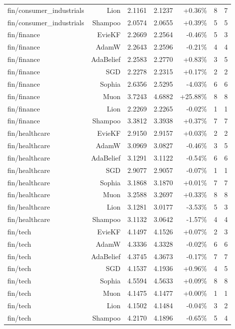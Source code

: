 \begin{table}[t]
\begin{tabular}{lrrrrrr}
fin/consumer\_industrials & Lion & 2.1161 & 2.1237 & +0.36\% & 8 & 7 \\
fin/consumer\_industrials & Shampoo & 2.0574 & 2.0655 & +0.39\% & 5 & 5 \\
fin/finance & EvieKF & 2.2669 & 2.2564 & -0.46\% & 5 & 3 \\
fin/finance & AdamW & 2.2643 & 2.2596 & -0.21\% & 4 & 4 \\
fin/finance & AdaBelief & 2.2583 & 2.2770 & +0.83\% & 3 & 5 \\
fin/finance & SGD & 2.2278 & 2.2315 & +0.17\% & 2 & 2 \\
fin/finance & Sophia & 2.6356 & 2.5295 & -4.03\% & 6 & 6 \\
fin/finance & Muon & 3.7243 & 4.6882 & +25.88\% & 8 & 8 \\
fin/finance & Lion & 2.2269 & 2.2265 & -0.02\% & 1 & 1 \\
fin/finance & Shampoo & 3.3812 & 3.3938 & +0.37\% & 7 & 7 \\
fin/healthcare & EvieKF & 2.9150 & 2.9157 & +0.03\% & 2 & 2 \\
fin/healthcare & AdamW & 3.0969 & 3.0827 & -0.46\% & 3 & 5 \\
fin/healthcare & AdaBelief & 3.1291 & 3.1122 & -0.54\% & 6 & 6 \\
fin/healthcare & SGD & 2.9077 & 2.9057 & -0.07\% & 1 & 1 \\
fin/healthcare & Sophia & 3.1868 & 3.1870 & +0.01\% & 7 & 7 \\
fin/healthcare & Muon & 3.2588 & 3.2697 & +0.33\% & 8 & 8 \\
fin/healthcare & Lion & 3.1281 & 3.0177 & -3.53\% & 5 & 3 \\
fin/healthcare & Shampoo & 3.1132 & 3.0642 & -1.57\% & 4 & 4 \\
fin/tech & EvieKF & 4.1497 & 4.1526 & +0.07\% & 2 & 3 \\
fin/tech & AdamW & 4.3336 & 4.3328 & -0.02\% & 6 & 6 \\
fin/tech & AdaBelief & 4.3745 & 4.3673 & -0.17\% & 7 & 7 \\
fin/tech & SGD & 4.1537 & 4.1936 & +0.96\% & 4 & 5 \\
fin/tech & Sophia & 4.5594 & 4.5633 & +0.09\% & 8 & 8 \\
fin/tech & Muon & 4.1475 & 4.1477 & +0.00\% & 1 & 1 \\
fin/tech & Lion & 4.1502 & 4.1484 & -0.04\% & 3 & 2 \\
fin/tech & Shampoo & 4.2170 & 4.1896 & -0.65\% & 5 & 4 \\
\bottomrule
\end{tabular}
\end{table}
